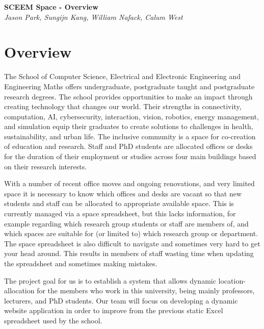 \documentclass[11pt,a4paper]{article}
\begin{document}
\begin{titlepage}
   \begin{center}
      \Large\textbf{SCEEM Space - Overview}\\
      \large\textit{Jason Park, Sungijn Kang, William Nafack, Calum West}
   \end{center}
\end{titlepage}

\section{Overview}
The School of Computer Science, Electrical and Electronic Engineering and Engineering Maths offers undergraduate, postgraduate taught and postgraduate research degrees. The school provides opportunities to make an impact through creating technology that changes our world. Their strengths in connectivity, computation, AI, cybersecurity, interaction, vision, robotics, energy management, and simulation equip their graduates to create solutions to challenges in health, sustainability, and urban life. The inclusive community is a space for co-creation of education and research. Staff and PhD students are allocated offices or desks for the duration of their employment or studies across four main buildings based on their research interests.
\bigskip

With a number of recent office moves and ongoing renovations, and very limited space it is necessary to know which offices and desks are vacant so that new students and staff can be allocated to appropriate available space. This is currently managed via a space spreadsheet, but this lacks information, for example regarding which research group students or staff are members of, and which spaces are suitable for (or limited to) which research group or department. The space spreadsheet is also difficult to navigate and sometimes very hard to get your head around. This results in members of staff wasting time when updating the spreadsheet and sometimes making mistakes.
\bigskip

The project goal for us is to establish a system that allows dynamic location-allocation for the members who work in this university, being mainly professors, lecturers, and PhD students. Our team will focus on developing a dynamic website application in order to improve from the previous static Excel spreadsheet used by the school.
\bigskip
\end{document}
